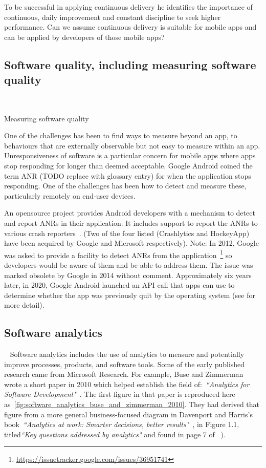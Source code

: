 To be successful in applying continuous delivery he identifies the importance of continuous, daily improvement and constant discipline to seek higher performance. Can we assume continuous delivery is suitable for mobile apps and can be applied by developers of those mobile apps? 


\subsection{Software quality, including measuring software quality}~\label{rw-software-quality-including-measurement-topic}



Measuring software quality

One of the challenges has been to find ways to measure beyond an app, to behaviours that are externally observable but not easy to measure within an app. Unresponsiveness of software is a particular concern for mobile apps where apps stop responding for longer than deemed acceptable. Google Android coined the term ANR (TODO replace with glossary entry) for when the application stops responding. One of the challenges has been how to detect and measure these, particularly remotely on end-user devices. 

An opensource project provides Android developers with a mechanism to detect and report ANRs in their application. It includes support to report the ANRs to various crash reporters~\cite{salomonbrys_github_anr_watchdog}. (Two of the four listed (Crashlytics and HockeyApp) have been acquired by Google and Microsoft respectively). Note: In 2012, Google was asked to provide a facility to detect ANRs from the application~\footnote{\url{https://issuetracker.google.com/issues/36951741}} so developers would be aware of them and be able to address them. The issue was marked obsolete by Google in 2014 without comment. Approximately six years later, in 2020, Google Android launched an API call that apps can use to determine whether the app was previously quit by the operating system (see  for more detail). 

\subsection{Software analytics}~\label{rw-software-analytics-topic}
Software analytics includes the use of analytics to measure and potentially improve processes, products, and software tools. Some of the early published research came from Microsoft Research. For example, Buse and Zimmerman wrote a short paper in 2010 which helped establish the field of:~\emph{``Analytics for Software Development"}~. The first figure in that paper is reproduced here as~\ref{fig:software_analytics_buse_and_zimmerman_2010}. They had derived that figure from a more general business-focused diagram in Davenport and Harris's book~\emph{``Analytics at work: Smarter decisions, better results"}~\cite{davenport2010analytics_at_work},  in Figure 1.1, titled\emph{``Key questions addressed by analytics"} and found in page 7 of ~). 

